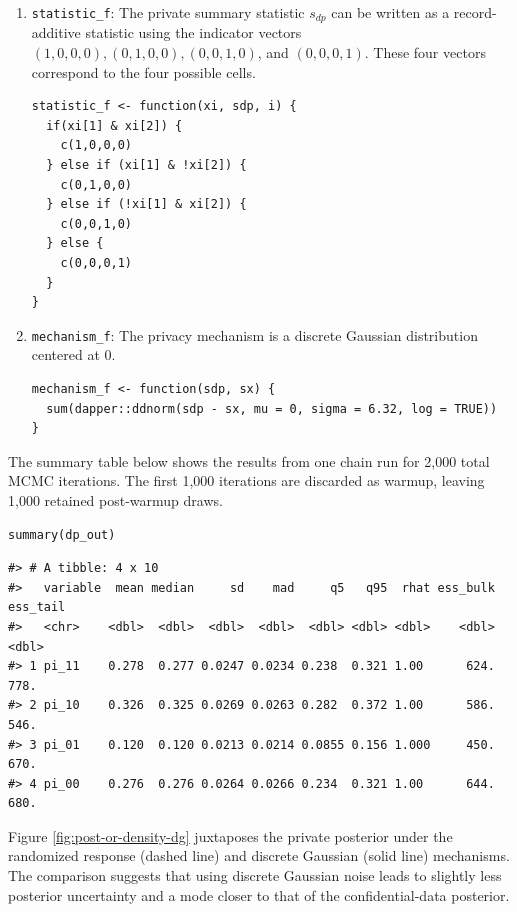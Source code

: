 \begin{enumerate}
\def\labelenumi{\arabic{enumi}.}
\item
  \texttt{statistic\_f}: The private summary statistic \(s_{dp}\) can be written as a record-additive
  statistic using the indicator vectors \((1,0,0,0), (0,1,0,0), (0,0,1,0)\), and \((0,0,0,1)\).
  These four vectors correspond to the four possible cells.

\begin{verbatim}
statistic_f <- function(xi, sdp, i) {
  if(xi[1] & xi[2]) {
    c(1,0,0,0)
  } else if (xi[1] & !xi[2]) {
    c(0,1,0,0)
  } else if (!xi[1] & xi[2]) {
    c(0,0,1,0)
  } else {
    c(0,0,0,1)
  }
}
\end{verbatim}
\item
  \texttt{mechanism\_f}: The privacy mechanism is a discrete Gaussian distribution centered
  at 0.

\begin{verbatim}
mechanism_f <- function(sdp, sx) {
  sum(dapper::ddnorm(sdp - sx, mu = 0, sigma = 6.32, log = TRUE))
}
\end{verbatim}
\end{enumerate}

The summary table below shows the results from one chain run for 2,000 total
MCMC iterations. The first 1,000 iterations are discarded as warmup, leaving
1,000 retained post-warmup draws.

\begin{verbatim}
summary(dp_out)
\end{verbatim}

\begin{verbatim}
#> # A tibble: 4 x 10
#>   variable  mean median     sd    mad     q5   q95  rhat ess_bulk ess_tail
#>   <chr>    <dbl>  <dbl>  <dbl>  <dbl>  <dbl> <dbl> <dbl>    <dbl>    <dbl>
#> 1 pi_11    0.278  0.277 0.0247 0.0234 0.238  0.321 1.00      624.     778.
#> 2 pi_10    0.326  0.325 0.0269 0.0263 0.282  0.372 1.00      586.     546.
#> 3 pi_01    0.120  0.120 0.0213 0.0214 0.0855 0.156 1.000     450.     670.
#> 4 pi_00    0.276  0.276 0.0264 0.0266 0.234  0.321 1.00      644.     680.
\end{verbatim}

Figure \ref{fig:post-or-density-dg} juxtaposes the private posterior under the
randomized response (dashed line) and discrete Gaussian (solid line) mechanisms. The
comparison suggests that using discrete Gaussian noise leads to slightly less posterior
uncertainty and a mode closer to that of the confidential-data posterior.

